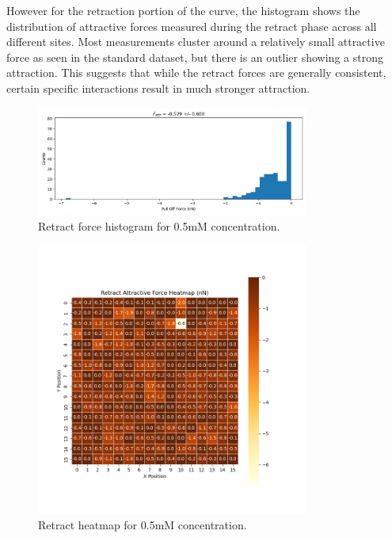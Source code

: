 However for the retraction portion of the curve, the histogram shows the distribution of attractive forces measured during the retract phase across all different sites. Most measurements cluster around a relatively small attractive force as seen in the standard dataset, but there is an outlier showing a strong attraction. This suggests that while the retract forces are generally consistent, certain specific interactions result in much stronger attraction. 

\begin{figure}[h!!!]
    \centering
    \includegraphics[width=0.8\textwidth]{chapter7/ForceMaps/0.5mM/retract_f_a_hist.jpg}
    \caption{Retract force histogram for 0.5mM concentration.}
    \label{fig:retract_f_a_hist_0.5mM}
\end{figure}

\begin{figure}[h!!!]
    \centering
    \includegraphics[width=0.8\textwidth]{chapter7/ForceMaps/0.5mM/Retract heatmap.png}
    \caption{Retract heatmap for 0.5mM concentration.}
    \label{fig:retract_heatmap_0.5mM}
\end{figure}

